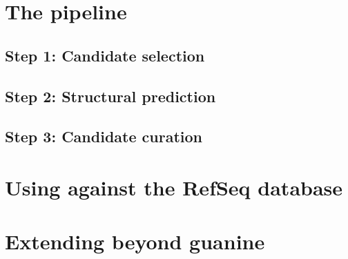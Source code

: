 \section{The \rfinder pipeline}
\label{sec:rfinder:pipeline}

\subsection{Step 1: Candidate selection}
\label{subsec:rfinder:selection}

\subsection{Step 2: Structural prediction}
\label{subsec:rfinder:consfold}

\subsection{Step 3: Candidate curation}
\label{subsec:rfinder:curation}

\section{Using \rfinder against the RefSeq database}
\label{sec:rfinder:refseq}

\section{Extending beyond guanine \rbs}
\label{sec:rfinder:ext}
